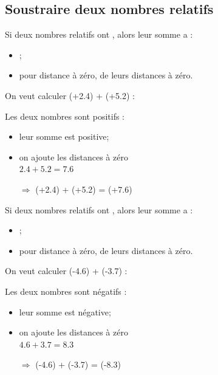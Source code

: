 \documentclass[xcolor={dvipsnames}]{beamer}
\begin{document}
\subsection{Soustraire deux nombres relatifs}

\begin{frame}
	\begin{myprop}
		Si deux nombres relatifs ont , alors leur somme a :\pause
		\begin{itemize}
			\item {};\pause
			\item pour distance à zéro, \pause {} de leurs distances à zéro.\pause
		\end{itemize}
	\end{myprop}


	\begin{myex}
		On veut calculer (+\num{2.4}) + (+\num{5.2}) : \pause
		
		Les deux nombres sont positifs :\pause
		\begin{itemize}
			\item leur somme est positive;\pause
			\item on ajoute les distances à zéro \\ $\num{2.4} + \num{5.2} = \num{7.6}$ \pause
			\item[$\Rightarrow$] (+\num{2.4}) + (+\num{5.2}) = \pause (+\num{7.6})
		\end{itemize}
	\end{myex}
\end{frame}


\begin{frame}
	\begin{myprop}
		Si deux nombres relatifs ont , alors leur somme a :
		\begin{itemize}
			\item \kword{le même signe};
			\item pour distance à zéro,   de leurs distances à zéro. 
		\end{itemize}
	\end{myprop}
	
	
	\begin{myex}
		On veut calculer (-\num{4.6}) + (-\num{3.7}) :
		
		Les deux nombres sont négatifs :\pause
		\begin{itemize}
			\item leur somme est négative;\pause
			\item on ajoute les distances à zéro \\ $\num{4.6} + \num{3.7} = \num{8.3}$ \pause
			\item[$\Rightarrow$] (-\num{4.6}) + (-\num{3.7}) = \pause (-\num{8.3})
		\end{itemize}
	\end{myex}
\end{frame}
\end{document}
